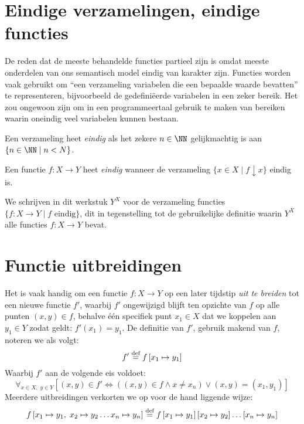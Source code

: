 \section{Eindige verzamelingen, eindige functies}

De reden dat de meeste behandelde functies partieel zijn is omdat meeste onderdelen van ons semantisch model eindig van karakter zijn. Functies worden vaak gebruikt om “een verzameling variabelen die een bepaalde waarde bevatten” te representeren, bijvoorbeeld de gedefiniëerde variabelen in een zeker bereik. Het zou ongewoon zijn om in een programmeertaal gebruik te maken van bereiken waarin oneindig veel variabelen kunnen bestaan.

Een verzameling heet \emph{eindig} als het zekere $n \in \NN$ gelijkmachtig is aan $\{n \in \NN \mid n < N\}$.

Een functie $f: X \to Y$ heet \emph{eindig} wanneer de verzameling $\{x \in X \mid f \downarrow x\}$ eindig is.

We schrijven in dit werkstuk $Y^X$ voor de verzameling functies $\{f : X \to Y \mid f \text{ eindig} \}$, dit in tegenstelling tot de gebruikelijke definitie waarin $Y^X$ alle functies $f : X \to Y$ bevat.

\section{Functie uitbreidingen}
\label{sec:uitbreiden}

Het is vaak handig om een functie $f : X \to Y$ op een later tijdstip \emph{uit te breiden} tot een nieuwe functie $f'$, waarbij $f'$ ongewijzigd blijft ten opzichte van $f$ op alle punten $(x, y) \in f$, behalve één specifiek punt $x_1 \in X$ dat we koppelen aan $y_1 \in Y$ zodat geldt: $f'(x_1) = y_1$. De definitie van $f'$, gebruik makend van $f$, noteren we als volgt:
%
\begin{equation*}
  f' \DEF f \left[ x_1 \mapsto y_1 \right]
\end{equation*}
%
Waarbij $f'$ aan de volgende eis voldoet:
%
\begin{equation*}
  \forall_{x \in X,\; y \in Y} \left[ (x, y) \in f' \Leftrightarrow \left( (x, y) \in f \land x \neq x_n \right) \lor (x, y) = (x_1, y_1) \right]
\end{equation*}
%
Meerdere uitbreidingen verkorten we op voor de hand liggende wijze:
%
\begin{equation*}
  f \left[ x_1 \mapsto y_1,\; x_2 \mapsto y_2 \dots x_n \mapsto y_n \right]
  \DEF
  f \left[ x_1 \mapsto y_1 \right]
    \left[ x_2 \mapsto y_2 \right]\dots
    \left[ x_n \mapsto y_n \right]
\end{equation*}

